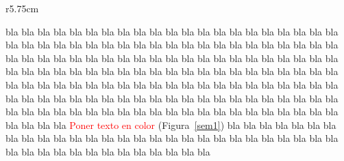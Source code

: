 \documentclass[12pt]{book}%
\theoremstyle{newstyle}%
\begin{document}
\begin{wrapfigure}{r}{5.75cm}
\begin{center}
\caption{Paralelogramo en el plano.}\label{sem1}
\end{center}
\end{wrapfigure}

bla bla bla bla bla bla bla bla bla bla bla bla bla bla bla bla bla bla bla bla bla bla bla bla bla bla bla bla bla bla bla bla bla bla bla bla bla bla bla bla bla bla bla bla bla bla bla bla bla bla bla bla bla bla bla bla bla bla bla bla bla bla bla bla bla bla bla bla bla bla bla bla bla bla bla bla bla bla bla bla bla bla bla bla bla bla bla bla bla bla bla bla bla bla bla bla bla bla bla bla bla bla bla bla bla bla bla bla bla bla bla bla bla bla bla bla bla bla bla bla bla bla bla bla bla bla bla bla bla bla bla bla bla bla bla bla bla bla bla bla bla bla bla bla bla bla bla bla bla bla bla \textcolor{red}{Poner texto en color} (Figura~\ref{sem1}) bla bla bla bla bla bla bla bla bla bla bla bla bla bla bla bla bla bla bla bla bla bla bla bla bla bla bla bla bla bla bla bla bla bla bla bla bla bla bla bla bla
\end{document}

